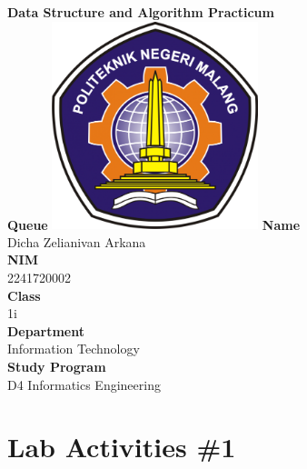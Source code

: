 \documentclass[12pt,titlepage]{article}
\newcommand{\vSubject}{Data Structure and Algorithm Practicum}
\newcommand{\vSubtitle}{Queue}
\newcommand{\vName}{Dicha Zelianivan Arkana}
\newcommand{\vNIM}{2241720002}
\newcommand{\vClass}{1i}
\newcommand{\vDepartment}{Information Technology}
\newcommand{\vStudyProgram}{D4 Informatics Engineering}
\begin{document}
\begin{titlepage}
    \centering
    \vfill
    {\bfseries\LARGE
        \vSubject\\
        \vskip0.25cm
        \vSubtitle
    }
    \vfill
    \includegraphics[width=6cm]{images/polinema-logo.png}
    \vfill
    {
        \textbf{Name}\\
        \vName\\
        \vskip0.5cm
        \textbf{NIM}\\
        \vNIM\\
        \vskip0.5cm
        \textbf{Class}\\
        \vClass\\
        \vskip0.5cm
        \textbf{Department}\\
        \vDepartment\\
        \vskip0.5cm
        \textbf{Study Program}\\
        \vStudyProgram
    }
\end{titlepage}

\section*{Lab Activities \#1}
\end{document}

